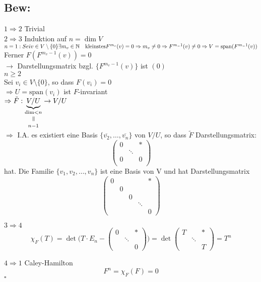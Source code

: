 \documentclass[titlepage,12pt,a4paper,ngerman]{report}
\newenvironment{bew}{\subsection{Bew:}}{\hfill$\square$}
\newcommand{\Bew}[1]{\begin{bew}#1\end{bew}}
\newcommand{\verteq}{\rotatebox{90}{$\,=$}}
\newcommand{\equalto}[2]{\underset{\scriptstyle\overset{\mkern4mu\verteq}{#2}}{#1}}
\newcommand{\tx}[1]{\textrm{#1}}
\newcommand{\ov}[1]{\overline{#1}}
\newcommand{\ub}[1]{\underbrace{#1}}
\newcommand{\spa}{\tx{span}}
\begin{document}
\Bew{$\boxed{1 \Rightarrow 2}$ Trivial\\
	$\boxed{2 \Rightarrow 3}$ Induktion auf $n = \dim V$
	$n = 1: Sei v \in V\setminus \{0\} \\
	\exists m_v \in \mathbb{N} \quad \tx{kleinstes} \\
	F^{m_v}(v) = 0 \\
	\Rightarrow m_v \neq 0 \\
	\Rightarrow F^{m_ - 1}(v) \neq 0 \\
	\Rightarrow V= \tx{span}(F^{m_ - 1}(v))$
	\noindent Ferner $ F(F^{m_v-1} (v)) = 0$\\
	\indent $\rightarrow$ Darstellungsmatrix bzgl. $\{F^{m_v-1}(v)\}$ ist $(0)$\\
	$n\ge 2$\\
	Sei $v_i \in V\setminus\{0\}$, so dass $F(v_i) = 0$\\
	$\Rightarrow U = \spa (v_i)$ ist $F$-invariant\\
	$ \Rightarrow \tilde{F}: \ub{V/U}_{\equalto{\dim < n}{n-1}} \to V/U $\\
	$\Rightarrow$ I.A. es existiert eine Basis $\{\ov{v_2}, \dots , \ov{v_n}\}$ von $V/U$, so dass $\tilde{F}$ Darstellungsmatrix:$$\begin{pmatrix}
	0 & & *\\
	& \ddots \\
	0 & & 0\\
	\end{pmatrix}$$ hat.
	Die Familie $ \{v_1,v_2,\dots , v_n\} $ ist eine Basis von V und hat Darstellungsmatrix 
	$$ \begin{pmatrix}
	0 & & & & * \\
	& 0 \\
	& & 0 \\
	& & & \ddots \\
	& & & & 0
	\end{pmatrix} $$
	
	$\boxed{3 \Rightarrow 4}$ \\
	$$\chi_F(T) = \det \bigg( T \cdot E_n - \begin{pmatrix}
	0 & & *\\
	& \ddots \\
	& & 0
	\end{pmatrix} \bigg) = \det\begin{pmatrix}
	T & & * \\
	& \ddots \\
	& & T
	\end{pmatrix} = T^n$$
	
	$\boxed{4 \Rightarrow 1}$  Caley-Hamilton\\
	$$F^n = \chi_F(F) = 0$$
}
\end{document}
